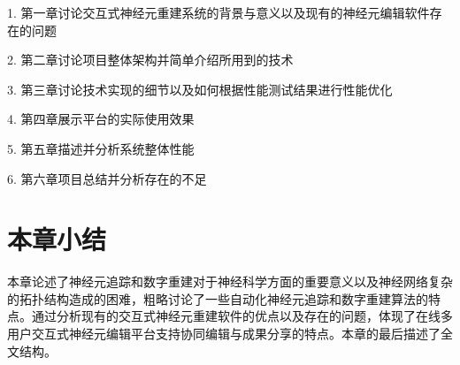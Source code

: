 1. 第一章讨论交互式神经元重建系统的背景与意义以及现有的神经元编辑软件存在的问题

2. 第二章讨论项目整体架构并简单介绍所用到的技术

3. 第三章讨论技术实现的细节以及如何根据性能测试结果进行性能优化

4. 第四章展示平台的实际使用效果

5. 第五章描述并分析系统整体性能

6. 第六章项目总结并分析存在的不足

\section{本章小结}
本章论述了神经元追踪和数字重建对于神经科学方面的重要意义以及神经网络复杂的拓扑结构造成的困难，粗略讨论了一些自动化神经元追踪和数字重建算法的特点。通过分析现有的交互式神经元重建软件的优点以及存在的问题，体现了在线多用户交互式神经元编辑平台支持协同编辑与成果分享的特点。本章的最后描述了全文结构。

